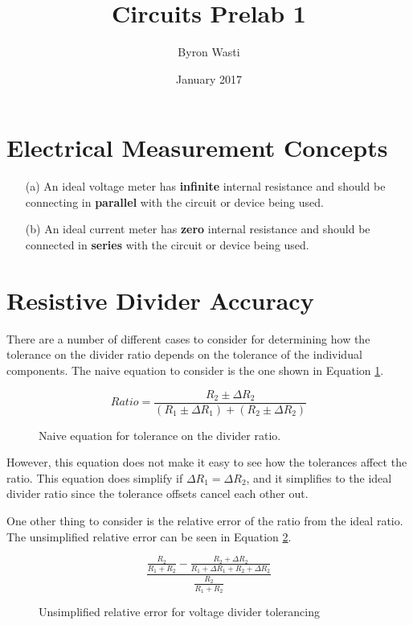 \documentclass{article}
\title{Circuits Prelab 1}
\author{Byron Wasti}
\date{January 2017}
\begin{document}
\maketitle

\section{Electrical Measurement Concepts}

\begin{itemize}
    \item [(a)] An ideal voltage meter has {\bf infinite} internal resistance and should be connecting in {\bf parallel} with the circuit or device being used.
    \item [(b)] An ideal current meter has {\bf zero} internal resistance and should be connected in {\bf series} with the circuit or device being used.
\end{itemize}

\section{Resistive Divider Accuracy}

There are a number of different cases to consider for determining how the tolerance on the divider ratio depends on the tolerance of the individual components. The naive equation to consider is the one shown in Equation \ref{eq:tolerance1}.

\begin{figure}[h!]
    \centering
    \begin{equation}
        Ratio = \frac{R_2 \pm \Delta R_2} {(R_1 \pm \Delta R_1) + (R_2 \pm \Delta R_2)}
    \end{equation}
    \caption{Naive equation for tolerance on the divider ratio.}
    \label{eq:tolerance1}
\end{figure}

However, this equation does not make it easy to see how the tolerances affect the ratio. This equation does simplify if $\Delta R_1 = \Delta R_2$, and it simplifies to the ideal divider ratio since the tolerance offsets cancel each other out. 

One other thing to consider is the relative error of the ratio from the ideal ratio. The unsimplified relative error can be seen in Equation \ref{eq:tolerance2}.

\begin{figure}[h!]
    \centering
    \begin{equation}
        \frac{ \frac{R_2}{R_1 + R_2}  -  \frac{R_2 + \Delta R_2} { R_1 + \Delta R_1 + R_2 + \Delta R_2 }} { \frac{R_2}{R_1 + R_2} }
    \end{equation}
    \caption{Unsimplified relative error for voltage divider tolerancing}
    \label{eq:tolerance2}
\end{figure}
\end{document}
